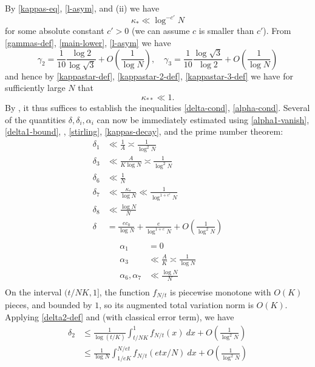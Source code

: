 \documentclass[10pt,a4paper,reqno]{amsart}
\numberwithin{equation}{section}
\theoremstyle{plain}
\theoremstyle{definition}
\begin{document}
By \eqref{kappas-eq}, \eqref{l-asym}, and (ii) we have
\begin{equation}\label{kappas-decay}
  \kappa_* \ll \log^{-c'} N
\end{equation}
for some absolute constant $c'>0$ (we can assume $c$ is smaller than $c'$).  From \eqref{gammas-def}, \eqref{main-lower}, \eqref{l-asym} we have
$$ \gamma_2 = \frac{1}{10} \frac{\log 2}{\log \sqrt{3}} + O\left(\frac{1}{\log N}\right), \quad
 \gamma_3 = \frac{1}{10} \frac{\log \sqrt{3}}{\log 2} + O\left(\frac{1}{\log N}\right)
$$
and hence by \eqref{kappastar-def},  \eqref{kappastar-2-def}, \eqref{kappastar-3-def} we have for sufficiently large $N$ that
$$ \kappa_{**} \ll 1.$$
By , it thus suffices to establish the inequalities \eqref{delta-cond}, \eqref{alpha-cond}.
Several of the quantities $\delta, \delta_i, \alpha_i$ can now be immediately estimated using \eqref{alpha1-vanish}, \eqref{delta1-bound}, , \eqref{stirling}, \eqref{kappas-decay}, and the prime number theorem:
\begin{align*}
  \delta_1 &\ll \frac{1}{A} \asymp \frac{1}{\log^2 N} \\
  \delta_3 &\ll \frac{A}{K \log N} \asymp \frac{1}{\log^2 N} \\
  \delta_6 &\ll \frac{1}{N} \\
  \delta_7 &\ll \frac{\kappa_*}{\log N} \ll \frac{1}{\log^{1+c'} N} \\
  \delta_8 &\ll \frac{\log N}{N} \\
  \delta &= \frac{ec_0}{\log N} + \frac{e}{\log^{1+c} N} + O\left( \frac{1}{\log^2 N} \right)\\
\end{align*}
\begin{align*}
  \alpha_1 &= 0 \\
  \alpha_3 &\ll \frac{A}{K} \asymp \frac{1}{\log N} \\
  \alpha_6, \alpha_7 &\ll \frac{\log N}{N} \\
\end{align*}
On the interval $(t/NK,1]$, the function $f_{N/t}$ is piecewise monotone with $O(K)$ pieces, and bounded by $1$, so its augmented total variation norm is $O(K)$.  Applying \eqref{delta2-def} and  (with classical error term), we have
\begin{align*}
\delta_2 &\leq \frac{1}{\log(t/K)} \int_{t/NK}^1 f_{N/t}(x)\ dx + O\left( \frac{1}{\log^2 N} \right) \\
&\leq \frac{1}{\log N} \int_{1/eK}^{N/et} f_{N/t}(etx/N)\ dx + O\left( \frac{1}{\log^2 N} \right)
\end{align*}
\end{document}
